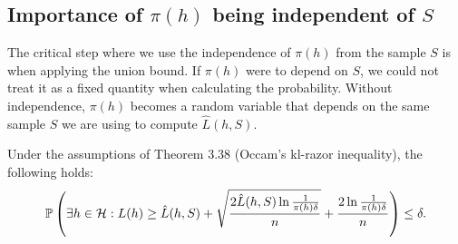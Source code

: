\subsection*{Importance of $\pi(h)$ being independent of $S$}

The critical step where we use the independence of $\pi(h)$ from the sample $S$ is when applying the union bound. If $\pi(h)$ were to depend on $S$, we could not treat it as a fixed quantity when calculating the probability. Without independence, $\pi(h)$ becomes a random variable that depends on the same sample $S$ we are using to compute $\hat{L}(h,S)$.


\begin{corollary}
Under the assumptions of Theorem 3.38 (Occam's kl-razor inequality), the following holds:
\begin{equation}
\P\left(\exists h \in \HH : L(h) \geq \hat{L}(h, S) + \sqrt{\frac{2\hat{L}(h,S)\ln \frac{1}{\pi(h)\delta}}{n}} + \frac{2\ln \frac{1}{\pi(h)\delta}}{n}\right) \leq \delta.
\end{equation}
\end{corollary}

